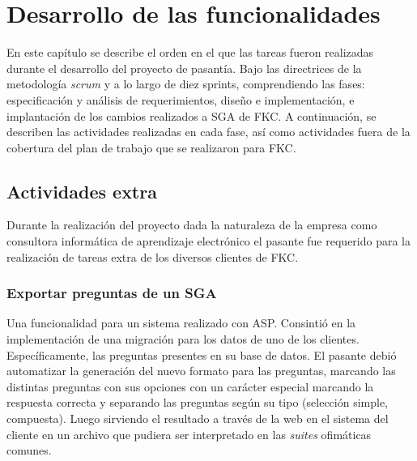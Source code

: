\chapter{Desarrollo de las funcionalidades}
\thispagestyle{empty} %

En este capítulo se describe el orden en el que las tareas fueron realizadas durante el desarrollo del proyecto de pasantía. Bajo las directrices de la metodología \emph{scrum} y a lo largo de diez sprints, comprendiendo las fases: especificación y análisis de requerimientos, diseño e implementación, e implantación de los cambios realizados a \gls{SGA} de \gls{FKC}. A continuación, se describen las actividades realizadas en cada fase, así como actividades fuera de la cobertura del plan de trabajo que se realizaron para \gls{FKC}.












\section{Actividades extra} %
\label{sec:actividades_extra}

Durante la realización del proyecto dada la naturaleza de la empresa como consultora informática de aprendizaje electrónico el pasante fue requerido para la realización de tareas extra de los diversos clientes de \gls{FKC}.

	\subsection{Exportar preguntas de un SGA} %
	\label{sub:exportar_preguntas_de_un_sga}


	Una funcionalidad para un sistema realizado con \gls{ASP}. Consintió en la implementación de una migración para los datos de uno de los clientes. Específicamente, las preguntas presentes en su base de datos. El pasante debió automatizar la generación del nuevo formato para las preguntas, marcando las distintas preguntas con sus opciones con un carácter especial marcando la respuesta correcta y separando las preguntas según su tipo (selección simple, compuesta). Luego sirviendo el resultado a través de la web en el sistema del cliente en un archivo que pudiera ser interpretado en las \emph{suites} ofimáticas comunes.

